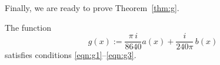 Finally, we are ready to prove Theorem~\ref{thm:g}.
\begin{theorem}\label{thm:g1}
The function
$$g(x):=\frac{\pi\,i}{8640}a(x)+\frac{i}{240\pi}\,b(x)$$
satisfies conditions \eqref{eqn:g1}--\eqref{eqn:g3}.
\end{theorem}
